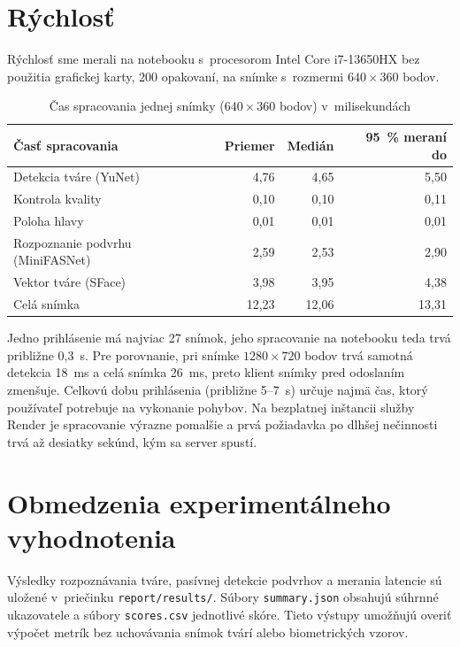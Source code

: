 \documentclass[12pt,a4paper,oneside]{report}
\begin{document}
\section{Rýchlosť}

Rýchlosť sme merali na notebooku s~procesorom
Intel Core i7-13650HX bez použitia grafickej karty, 200 opakovaní, na snímke s~rozmermi
$640\times360$ bodov.

\begin{table}[H]
  \centering
  \caption{Čas spracovania jednej snímky ($640\times360$ bodov) v~milisekundách}
  \label{tab:latencia}
  \begin{tabular}{@{}lrrr@{}}
    \toprule
    Časť spracovania & Priemer & Medián & 95~\% meraní do \\
    \midrule
    Detekcia tváre (YuNet) & 4,76 & 4,65 & 5,50 \\
    Kontrola kvality & 0,10 & 0,10 & 0,11 \\
    Poloha hlavy & 0,01 & 0,01 & 0,01 \\
    Rozpoznanie podvrhu (MiniFASNet) & 2,59 & 2,53 & 2,90 \\
    Vektor tváre (SFace) & 3,98 & 3,95 & 4,38 \\
    \midrule
    Celá snímka & 12,23 & 12,06 & 13,31 \\
    \bottomrule
  \end{tabular}
\end{table}

Jedno prihlásenie má najviac 27 snímok, jeho spracovanie na notebooku teda trvá
približne 0,3~s. Pre porovnanie, pri snímke $1280\times720$ bodov trvá samotná detekcia
18~ms a celá snímka 26~ms, preto klient snímky pred odoslaním zmenšuje. Celkovú dobu
prihlásenia (približne 5--7~s) určuje najmä čas, ktorý používateľ potrebuje na vykonanie
pohybov. Na bezplatnej inštancii služby Render je spracovanie výrazne pomalšie a prvá
požiadavka po dlhšej nečinnosti trvá až desiatky sekúnd, kým sa server spustí.


\section{Obmedzenia experimentálneho vyhodnotenia}

Výsledky rozpoznávania tváre, pasívnej detekcie podvrhov a merania latencie
sú uložené v~priečinku \texttt{report/results/}. Súbory \texttt{summary.json}
obsahujú súhrnné ukazovatele a súbory \texttt{scores.csv} jednotlivé skóre.
Tieto výstupy umožňujú overiť výpočet metrík bez uchovávania snímok tvárí
alebo biometrických vzorov.
\end{document}
